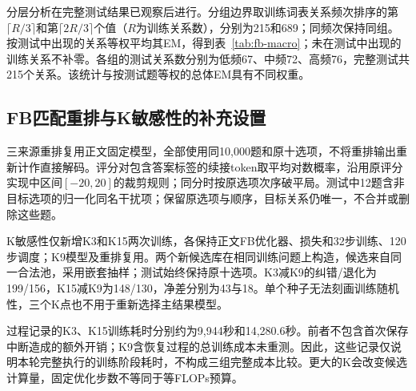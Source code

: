 分层分析在完整测试结果已观察后进行。分组边界取训练词表关系频次排序的第$\lceil R/3\rceil$和第$\lceil2R/3\rceil$个值（$R$为训练关系数），分别为215和689；同频次保持同组。按测试中出现的关系等权平均其EM，得到表~\ref{tab:fb-macro}；未在测试中出现的训练关系不补零。各组的测试关系数分别为低频67、中频72、高频76，完整测试共215个关系。该统计与按测试题等权的总体EM具有不同权重。




\subsection{FB匹配重排与K敏感性的补充设置}
\label{sec:fb-rank-repro}

三来源重排复用正文固定模型，全部使用同10,000题和原十选项，不将重排输出重新计作直接解码。评分对包含答案标签的续接token取平均对数概率，沿用原评分实现中区间$[-20,20]$的裁剪规则；同分时按原选项次序破平局。测试中12题含非目标选项的归一化同名干扰项；保留原选项与顺序，目标关系仍唯一，不合并或删除这些题。

K敏感性仅新增K3和K15两次训练，各保持正文FB优化器、损失和32步训练、120步调度；K9模型及重排复用。两个新候选库在相同训练问题上构造，候选来自同一合法池，采用嵌套抽样；测试始终保持原十选项。K3减K9的纠错/退化为199/156，K15减K9为148/130，净差分别为43与18。单个种子无法刻画训练随机性，三个K点也不用于重新选择主结果模型。

过程记录的K3、K15训练耗时分别约为9,944秒和14,280.6秒。前者不包含首次保存中断造成的额外开销；K9含恢复过程的总训练成本未重测。因此，这些记录仅说明本轮完整执行的训练阶段耗时，不构成三组完整成本比较。更大的K会改变候选计算量，固定优化步数不等同于等FLOPs预算。


